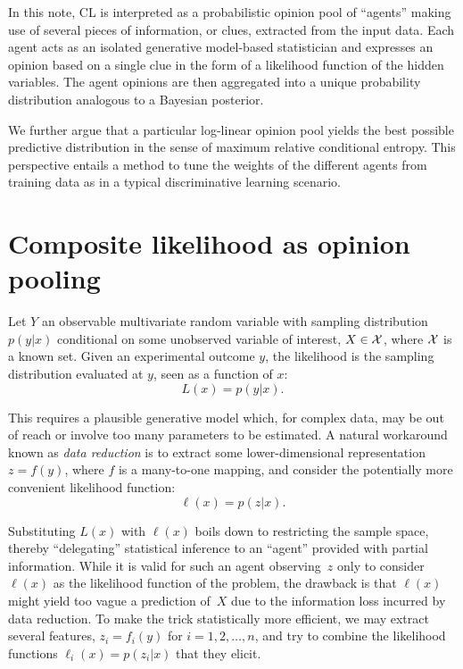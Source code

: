 \documentclass[english]{scrartcl}
\begin{document}
In this note, CL is interpreted as a probabilistic opinion pool of ``agents'' making use of several pieces of information, or clues, extracted from the input data. Each agent acts as an isolated generative model-based statistician and expresses an opinion based on a single clue in the form of a likelihood function of the hidden variables. The agent opinions are then aggregated into a unique probability distribution analogous to a Bayesian posterior.

We further argue that a particular log-linear opinion pool yields the best possible predictive distribution in the sense of maximum relative conditional entropy. This perspective entails a method to tune the weights of the different agents from training data as in a typical discriminative learning scenario.


\section{Composite likelihood as opinion pooling}
\label{sec:pool}

Let $Y$ an observable multivariate random variable with sampling distribution $p(y|x)$ conditional on some unobserved variable of interest, $X\in{\cal X}$, where ${\cal X}$ is a known set. Given an experimental outcome $y$, the likelihood is the sampling distribution evaluated at $y$, seen as a function of $x$:
$$
L(x) = p(y|x)
.
$$

This requires a plausible generative model which, for complex data, may be out of reach or involve too many parameters to be estimated. A natural workaround known as {\em data reduction} is to extract some lower-dimensional representation $z=f(y)$, where $f$ is a many-to-one mapping, and consider the potentially more convenient likelihood function:
$$
\ell(x) = p(z|x)
.
$$

Substituting $L(x)$ with $\ell(x)$ boils down to restricting the sample space, thereby  ``delegating'' statistical inference to an ``agent'' provided with partial information. While it is valid for such an agent observing~$z$ only to consider $\ell(x)$ as the likelihood function of the problem, the drawback is that $\ell(x)$ might yield too vague a prediction of~$X$ due to the information loss incurred by data reduction. To make the trick statistically more efficient, we may extract several features, $z_i=f_i(y)$ for $i=1,2,\ldots,n$, and try to combine the likelihood functions $\ell_i(x) = p(z_i|x)$ that they elicit.
\end{document}
